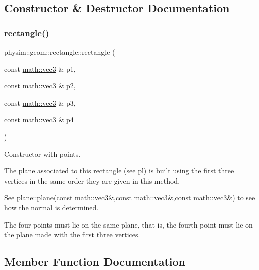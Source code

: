 \subsection{Constructor \& Destructor Documentation}
\mbox{\label{classphysim_1_1geom_1_1rectangle_aab87c4d353913cacdf4b1ef9587b7e7e}} 
\subsubsection{\texorpdfstring{rectangle()}{rectangle()}}
{\footnotesize\ttfamily physim\+::geom\+::rectangle\+::rectangle (\begin{DoxyParamCaption}\item[{const \hyperlink{structphysim_1_1math_1_1vec3}{math\+::vec3} \&}]{p1,  }\item[{const \hyperlink{structphysim_1_1math_1_1vec3}{math\+::vec3} \&}]{p2,  }\item[{const \hyperlink{structphysim_1_1math_1_1vec3}{math\+::vec3} \&}]{p3,  }\item[{const \hyperlink{structphysim_1_1math_1_1vec3}{math\+::vec3} \&}]{p4 }\end{DoxyParamCaption})}



Constructor with points. 

The plane associated to this rectangle (see \hyperlink{classphysim_1_1geom_1_1rectangle_aaf289e8860e9cd816d3ea93da2adde9a}{pl}) is built using the first three vertices in the same order they are given in this method.

See \hyperlink{classphysim_1_1geom_1_1plane_a2dd759ec4519cfd2fb943bda36988f9a}{plane\+::plane(const math\+::vec3\&,const math\+::vec3\&,const math\+::vec3\&)} to see how the normal is determined.

The four points must lie on the same plane, that is, the fourth point must lie on the plane made with the first three vertices. 

\subsection{Member Function Documentation}
\mbox{\label{classphysim_1_1geom_1_1rectangle_acdc3e93ccf70772aa42729773ef63345}} 
